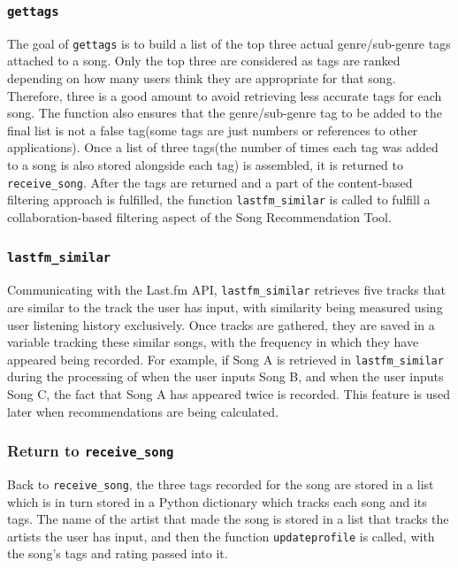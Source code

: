 \documentclass{l4proj}
\begin{document}
\subsubsection{\texttt{gettags}}
The goal of \texttt{gettags} is to build a list of the top three actual genre/sub-genre tags attached to a song. Only the top three are considered as tags are ranked depending on how many users think they are appropriate for that song. Therefore, three is a good amount to avoid retrieving less accurate tags for each song. The function also ensures that the genre/sub-genre tag to be added to the final list is not a false tag(some tags are just numbers or references to other applications). Once a list of three tags(the number of times each tag was added to a song is also stored alongside each tag) is assembled, it is returned to \texttt{receive\_song}. After the tags are returned and a part of the content-based filtering approach is fulfilled, the function \texttt{lastfm\_similar} is called to fulfill a collaboration-based filtering aspect of the Song Recommendation Tool.
\subsubsection{\texttt{lastfm\_similar}}
Communicating with the Last.fm API, \texttt{lastfm\_similar} retrieves five tracks that are similar to the track the user has input, with similarity being measured using user listening history exclusively. Once tracks are gathered, they are saved in a variable tracking these similar songs, with the frequency in which they have appeared being recorded. For example, if Song A is retrieved in \texttt{lastfm\_similar} during the processing of when the user inputs Song B, and when the user inputs Song C, the fact that Song A has appeared twice is recorded. This feature is used later when recommendations are being calculated.
\subsubsection{Return to \texttt{receive\_song}}
Back to \texttt{receive\_song}, the three tags recorded for the song are stored in a list which is in turn stored in a Python dictionary which tracks each song and its tags. The name of the artist that made the song is stored in a list that tracks the artists the user has input, and then the function \texttt{updateprofile} is called, with the song's tags and rating passed into it.
\end{document}
